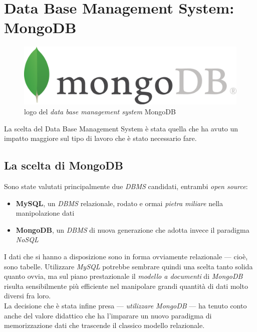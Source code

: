 \section{Data Base Management System: MongoDB}

    \begin{figure}
        \centering
        \caption{logo del \textit{data base management system} MongoDB}
        \label{mongodb_logo}
    	\includegraphics[scale=0.65]{img/mongodb.png}
    \end{figure}

    La scelta del Data Base Management System è stata quella che ha avuto un impatto maggiore sul tipo di lavoro che è stato necessario fare.

    \subsection{La scelta di MongoDB}

        Sono state valutati principalmente due \textit{DBMS} candidati, entrambi \textit{open source}:

        \begin{itemize}
            \item \textbf{MySQL}, un \textit{DBMS} relazionale, rodato e ormai \textit{pietra miliare} nella manipolazione dati
            \item \textbf{MongoDB}, un \textit{DBMS} di nuova generazione che adotta invece il paradigma \textit{NoSQL}
        \end{itemize}

        I dati che si hanno a disposizione sono in forma ovviamente relazionale --- cioè, sono tabelle. Utilizzare \textit{MySQL} potrebbe sembrare quindi una scelta tanto solida quanto ovvia, ma sul piano prestazionale il \textit{modello a documenti} di \textit{MongoDB} risulta sensibilmente più efficiente nel manipolare grandi quantità di dati molto diversi fra loro. \\

        La decisione che è stata infine presa --- \textit{utilizzare MongoDB} --- ha tenuto conto anche del valore didattico che ha l'imparare un nuovo paradigma di memorizzazione dati che trascende il classico modello relazionale.

